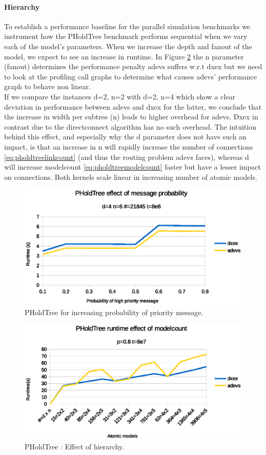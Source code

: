\paragraph*{Hierarchy}
To establish a performance baseline for the parallel simulation benchmarks we instrument how the PHoldTree benchmark performs sequential when we vary each of the model's parameters. 
When we increase the depth and fanout of the model, we expect to see an increase in runtime. In Figure \ref{fig:PHoldtree_seq_dn_benchmark} the n parameter (fanout) determines the performance penalty adevs suffers w.r.t dxex but we need to look at the profiling call graphs to determine what causes adevs' performance graph to behave non linear. \\
If we compare the instances d=2, n=2 with d=2, n=4 which show a clear deviation in performance between adevs and dxex for the latter, we conclude that the increase in width per subtree (n) leads to higher overhead for adevs. Dxex in contrast due to the directconnect algorithm has no such overhead. The intuition behind this effect, and especially why the d parameter does not have such an impact, is that an increase in n will rapidly increase the number of connections \ref{eq:pholdtreelinkcount} (and thus the routing problem adevs faces), whereas d will increase modelcount \ref{eq:pholdtreemodelcount} faster but have a lesser impact on connections. Both kernels scale linear in increasing number of atomic models. 
\begin{figure}
	\center
	\includegraphics[width=\plotfraction\columnwidth]{fig/pholdtree_sequential_p.eps}
	\caption{PHoldTree for increasing probability of priority message.}
	\label{fig:PHoldtree_seq_p_benchmark}
\end{figure}
\begin{figure}
	\center
	\includegraphics[width=\plotfraction\columnwidth]{fig/pholdtree_sequential_dn.eps}
	\caption{PHoldTree : Effect of hierarchy.}
	\label{fig:PHoldtree_seq_dn_benchmark}
\end{figure}